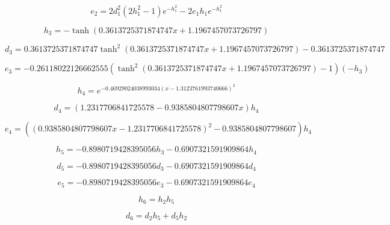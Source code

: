 \begin{equation}
e_{2}=2 d_{1}^{2} \left(2 h_{1}^{2} - 1\right) e^{- h_{1}^{2}} - 2 e_{1} h_{1} e^{- h_{1}^{2}}
\end{equation}


\begin{equation}
h_{3}=- \tanh{\left(0.3613725371874747 x + 1.1967457073726797 \right)}
\end{equation}


\begin{equation}
d_{3}=0.3613725371874747 \tanh^{2}{\left(0.3613725371874747 x + 1.1967457073726797 \right)} - 0.3613725371874747
\end{equation}


\begin{equation}
e_{3}=- 0.26118022126662555 \left(\tanh^{2}{\left(0.3613725371874747 x + 1.1967457073726797 \right)} - 1\right) (-h_{3})
\end{equation}


\begin{equation}
h_{4}=e^{- 0.46929024038993034 \left(x - 1.3123761993740666\right)^{2}}
\end{equation}


\begin{equation}
d_{4}=\left(1.2317706841725578 - 0.9385804807798607 x\right) h_{4}
\end{equation}


\begin{equation}
e_{4}=\left(\left(0.9385804807798607 x - 1.2317706841725578\right)^{2} - 0.9385804807798607\right) h_{4}
\end{equation}


\begin{equation}
h_{5}=- 0.8980719428395056 h_{3} - 0.6907321591909864 h_{4}
\end{equation}


\begin{equation}
d_{5}=- 0.8980719428395056 d_{3} - 0.6907321591909864 d_{4}
\end{equation}


\begin{equation}
e_{5}=- 0.8980719428395056 e_{3} - 0.6907321591909864 e_{4}
\end{equation}


\begin{equation}
h_{6}=h_{2} h_{5}
\end{equation}


\begin{equation}
d_{6}=d_{2} h_{5} + d_{5} h_{2}
\end{equation}


